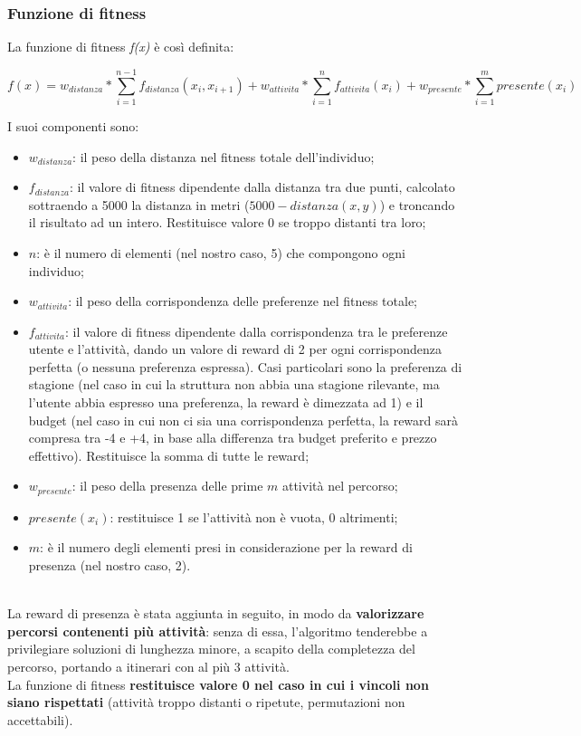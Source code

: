 \documentclass{CSUniSchoolLabReport}
\begin{document}
\subsubsection{Funzione di fitness}

La funzione di fitness \textit{f(x)} è così definita:

$$f(x) = w_{distanza} * \sum_{i=1}^{n-1} f_{distanza}(x_i, x_{i+1}) + w_{attivita} * \sum_{i=1}^{n} f_{attivita}(x_i) + w_{presente} * \sum_{i=1}^m presente(x_i)$$

I suoi componenti sono:
\begin{itemize}
    \item $w_{distanza}$: il peso della distanza nel fitness totale dell'individuo;
    \item $f_{distanza}$: il valore di fitness dipendente dalla distanza tra due punti, calcolato sottraendo a 5000 la distanza in metri ($5000 - distanza(x, y)$) e troncando il risultato ad un intero. Restituisce valore 0 se troppo distanti tra loro;
    \item $n$: è il numero di elementi (nel nostro caso, 5) che compongono ogni individuo;
    \item $w_{attivita}$: il peso della corrispondenza delle preferenze nel fitness totale;
    \item $f_{attivita}$: il valore di fitness dipendente dalla corrispondenza tra le preferenze utente e l'attività, dando un valore di reward di 2 per ogni corrispondenza perfetta (o nessuna preferenza espressa). Casi particolari sono la preferenza di stagione (nel caso in cui la struttura non abbia una stagione rilevante, ma l'utente abbia espresso una preferenza, la reward è dimezzata ad 1) e il budget (nel caso in cui non ci sia una corrispondenza perfetta, la reward sarà compresa tra -4 e +4, in base alla differenza tra budget preferito e prezzo effettivo). Restituisce la somma di tutte le reward;
    \item $w_{presente}$: il peso della presenza delle prime $m$ attività nel percorso;
    \item $presente(x_i)$: restituisce 1 se l'attività non è vuota, 0 altrimenti;
    \item $m$: è il numero degli elementi presi in considerazione per la reward di presenza (nel nostro caso, 2).
\end{itemize}
~\\
La reward di presenza è stata aggiunta in seguito, in modo da \textbf{valorizzare percorsi contenenti più attività}: senza di essa, l'algoritmo tenderebbe a privilegiare soluzioni di lunghezza minore, a scapito della completezza del percorso, portando a itinerari con al più 3 attività.\\
La funzione di fitness \textbf{restituisce valore 0 nel caso in cui i vincoli non siano rispettati} (attività troppo distanti o ripetute, permutazioni non accettabili).
\end{document}
